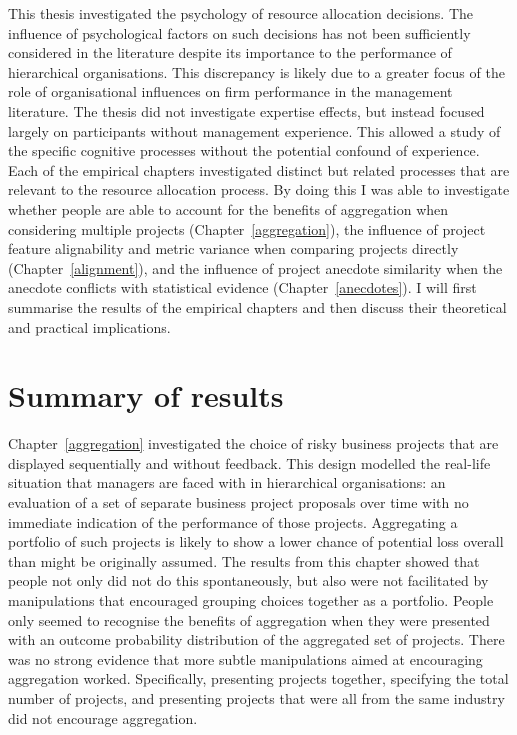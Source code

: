 \documentclass[a4paper, nobind, dvipsnames]{templates/ociamthesis}
\theoremstyle{definition}
\theoremstyle{definition}
\theoremstyle{definition}
\theoremstyle{definition}
\theoremstyle{remark}
\begin{document}
\minitoc

This thesis investigated the psychology of resource allocation decisions. The
influence of psychological factors on such decisions has not been sufficiently
considered in the literature despite its importance to the performance of
hierarchical organisations. This discrepancy is likely due to a greater focus of
the role of organisational influences on firm performance in the management
literature. The thesis did not investigate expertise effects, but instead
focused largely on participants without management experience. This allowed a
study of the specific cognitive processes without the potential confound of
experience. Each of the empirical chapters investigated distinct but related
processes that are relevant to the resource allocation process. By doing this I
was able to investigate whether people are able to account for the benefits of
aggregation when considering multiple projects (Chapter~\ref{aggregation}), the
influence of project feature alignability and metric variance when comparing
projects directly (Chapter~\ref{alignment}), and the influence of project
anecdote similarity when the anecdote conflicts with statistical evidence
(Chapter~\ref{anecdotes}). I will first summarise the results of the empirical
chapters and then discuss their theoretical and practical implications.

\hypertarget{summary-of-results}{%
\section{Summary of results}\label{summary-of-results}}

Chapter~\ref{aggregation} investigated the choice of risky business projects
that are displayed sequentially and without feedback. This design modelled the
real-life situation that managers are faced with in hierarchical organisations:
an evaluation of a set of separate business project proposals over time with no
immediate indication of the performance of those projects. Aggregating a
portfolio of such projects is likely to show a lower chance of potential loss
overall than might be originally assumed. The results from this chapter showed
that people not only did not do this spontaneously, but also were not
facilitated by manipulations that encouraged grouping choices together as a
portfolio. People only seemed to recognise the benefits of aggregation when they
were presented with an outcome probability distribution of the aggregated set of
projects. There was no strong evidence that more subtle manipulations aimed at
encouraging aggregation worked. Specifically, presenting projects together,
specifying the total number of projects, and presenting projects that were all
from the same industry did not encourage aggregation.
\end{document}

